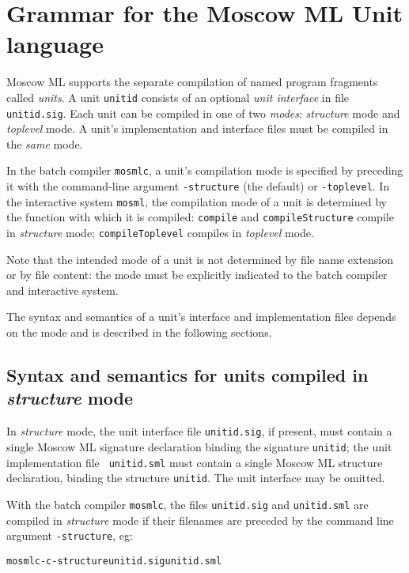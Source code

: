 \documentclass[fleqn,a4paper]{article}
\newcounter{extension}
\begin{document}
\newpage

\section{Grammar for the Moscow ML Unit language}


Moscow ML supports the separate compilation of named program fragments
called \emph{units}.  A unit {\tt unitid} consists of an optional
\emph{unit interface} in file {\tt unitid.sig}.  Each unit can be
compiled in one of two \emph{modes}: \emph{structure} mode and
\emph{toplevel} mode.  A unit's implementation and interface files
must be compiled in the \emph{same} mode.

In the batch compiler {\tt mosmlc}, a unit's compilation mode is
specified by preceding it with the command-line argument {\tt -structure} 
(the default) or {\tt -toplevel}.  In the interactive
system {\tt mosml}, the compilation mode of a unit is determined by
the function with which it is compiled: {\tt compile} and 
{\tt compileStructure} compile in \emph{structure} mode; 
{\tt compileToplevel} compiles in \emph{toplevel} mode.

Note that the intended mode of a unit is not determined by file name
extension or by file content: the mode must be explicitly indicated
to the batch compiler and interactive system.

The syntax and semantics of a unit's interface and implementation
files depends on the mode and is described in the following sections.


\subsection{Syntax and semantics for units compiled in \emph{structure} mode}

In \emph{structure} mode, the unit interface file {\tt unitid.sig}, if
present, must contain a single Moscow ML signature declaration binding
the signature {\tt unitid}; the unit implementation file {\tt
  unitid.sml} must contain a single Moscow ML structure declaration,
binding the structure {\tt unitid}.  The unit interface may be
omitted.

With the batch compiler {\tt mosmlc}, the files {\tt unitid.sig} and
{\tt unitid.sml} are compiled in \emph{structure} mode if their
filenames are preceded by the command line argument {\tt -structure},
eg:

\begin{alltt}
   mosmlc -c -structure unitid.sig unitid.sml 
\end{alltt}
\end{document}
